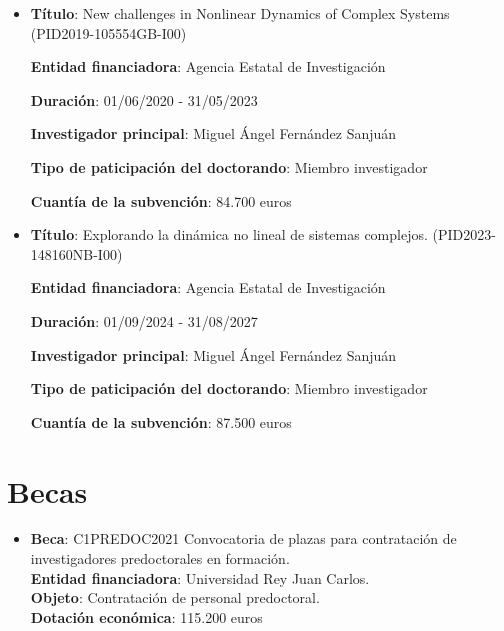 \begin{itemize}

\item
\textbf{Título}: New challenges in Nonlinear Dynamics of Complex Systems (PID2019-105554GB-I00) 

\textbf{Entidad financiadora}: Agencia Estatal de Investigación

\textbf{Duración}: 01/06/2020 - 31/05/2023

\textbf{Investigador principal}: Miguel Ángel Fernández Sanjuán

\textbf{Tipo de paticipación del doctorando}: Miembro investigador

\textbf{Cuantía de la subvención}: 84.700 euros


\item
\textbf{Título}: Explorando la dinámica no lineal de sistemas complejos. (PID2023-148160NB-I00) 

\textbf{Entidad financiadora}: Agencia Estatal de Investigación

\textbf{Duración}: 01/09/2024 - 31/08/2027

\textbf{Investigador principal}: Miguel Ángel Fernández Sanjuán

\textbf{Tipo de paticipación del doctorando}: Miembro investigador

\textbf{Cuantía de la subvención}: 87.500 euros



\end{itemize}


\section*{Becas}

\begin{itemize}


\item
\textbf{Beca}: C1PREDOC2021 Convocatoria de plazas para contratación de investigadores predoctorales en formación.\\
\textbf{Entidad financiadora}: Universidad Rey Juan Carlos.\\
\textbf{Objeto}: Contratación de personal predoctoral.\\
\textbf{Dotación económica}: 115.200 euros




\end{itemize}